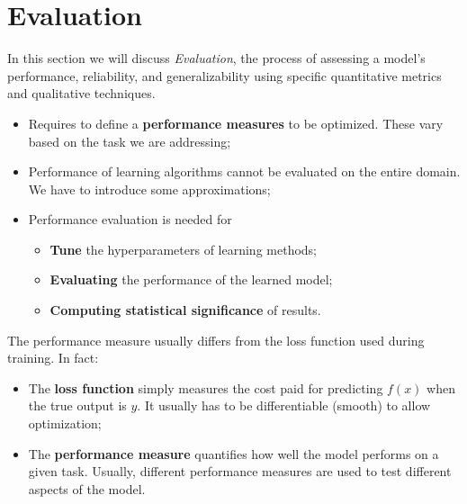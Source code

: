 \section{Evaluation}
In this section we will discuss \textit{Evaluation}, the process of assessing a model's performance, 
reliability, and generalizability using specific quantitative metrics and qualitative techniques.
\begin{itemize}
	\item Requires to define a \textbf{performance measures} to be optimized. 
	These vary based on the task we are addressing;
	\item Performance of learning algorithms cannot be evaluated on the entire domain. We have to
	introduce some approximations;
	\item Performance evaluation is needed for
	\begin{itemize}
		\item \textbf{Tune} the hyperparameters of learning methods;
		\item \textbf{Evaluating} the performance of the learned model;
		\item \textbf{Computing statistical significance} of results.
	\end{itemize}
\end{itemize}
The performance measure usually differs from the loss function used during training. In fact:
\begin{itemize}
	\item The \textbf{loss function} simply measures the cost paid for predicting $f(x)$ when the true output is $y$.
	It usually has to be differentiable (smooth) to allow optimization;
	\item The \textbf{performance measure} quantifies how well the model performs on a given task.
	Usually, different performance measures are used to test different aspects of the model.
\end{itemize}

